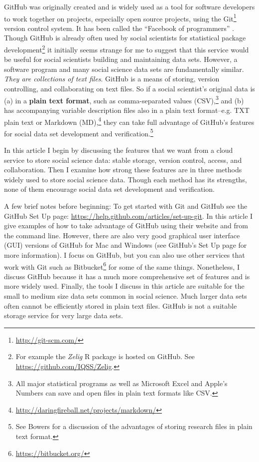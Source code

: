 \documentclass[twocolumn]{article}\usepackage{graphicx, color}
\begin{document}
GitHub was originally created and is widely used as a tool for software developers to work together on projects, especially open source projects, using the Git\footnote{\url{http://git-scm.com/}} version control system. It has been called the ``Facebook of programmers'' \citep{Xie2011}. Though GitHub is already often used by social scientists for statistical package development\footnote{For example the \emph{Zelig} R package \citep{Zelig2008,R-Zelig} is hosted on GitHub. See \url{https://github.com/IQSS/Zelig}.} it initially seems strange for me to suggest that this service would be useful for social scientists building and maintaining data sets. However, a software program and many social science data sets are fundamentally similar. \emph{They are collections of text files}. GitHub is a means of storing, version controlling, and collaborating on text files. So if a social scientist's original data is (a) in a \textbf{plain text format}, such as comma-separated values (CSV),\footnote{All major statistical programs as well as Microsoft Excel and Apple's Numbers can save and open files in plain text formats like CSV.} and (b) has accompanying variable description files also in a plain text format--e.g. TXT plain text or Markdown (MD),\footnote{\url{http://daringfireball.net/projects/markdown/}} they can take full advantage of GitHub's features for social data set development and verification.\footnote{See Bowers \citeyearpar[3]{Bowers2011} for a discussion of the advantages of storing research files in plain text format.}

In this article I begin by discussing the features that we want from a cloud service to store social science data: stable storage, version control, access, and collaboration. Then I examine how strong these features are in three methods widely used to store social science data. Though each method has its strengths, none of them encourage social data set development and verification.

A few brief notes before beginning: To get started with Git and GitHub see the GitHub Set Up page: \url{https://help.github.com/articles/set-up-git}. In this article I give examples of how to take advantage of GitHub using their website and from the command line. However, there are also very good graphical user interface (GUI) versions of GitHub for Mac and Windows (see GitHub's Set Up page for more information). I focus on GitHub, but you can also use other services that work with Git such as Bitbucket\footnote{\url{https://bitbucket.org/}} for some of the same things. Nonetheless, I discuss GitHub because it has a much more comprehensive set of features and is more widely used. Finally, the tools I discuss in this article are suitable for the small to medium size data sets common in social science. Much larger data sets often cannot be efficiently stored in plain text files. GitHub is not a suitable storage service for very large data sets.
\end{document}
